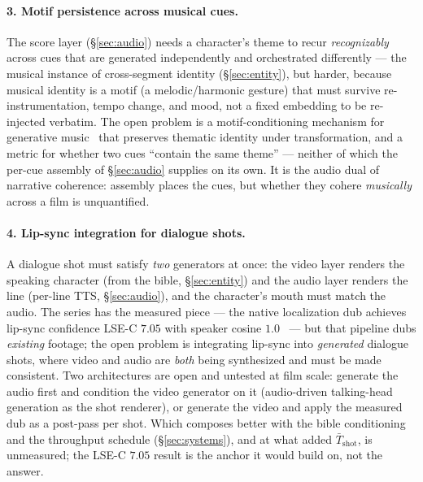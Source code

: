 \documentclass[11pt]{article}
\newcommand{\Tshot}{\ensuremath{\bar{T}_{\mathrm{shot}}}}
\begin{document}
\paragraph{3. Motif persistence across musical cues.} The score layer (\S\ref{sec:audio}) needs a character's
theme to recur \emph{recognizably} across cues that are generated independently and orchestrated differently ---
the musical instance of cross-segment identity (\S\ref{sec:entity}), but harder, because musical identity is a
motif (a melodic/harmonic gesture) that must survive re-instrumentation, tempo change, and mood, not a fixed
embedding to be re-injected verbatim. The open problem is a motif-conditioning mechanism for generative
music~\cite{acestep} that preserves thematic identity under transformation, and a metric for whether two cues
``contain the same theme'' --- neither of which the per-cue assembly of \S\ref{sec:audio} supplies on its own.
It is the audio dual of narrative coherence: assembly places the cues, but whether they cohere \emph{musically}
across a film is unquantified.

\paragraph{4. Lip-sync integration for dialogue shots.} A dialogue shot must satisfy \emph{two} generators at
once: the video layer renders the speaking character (from the bible, \S\ref{sec:entity}) and the audio layer
renders the line (per-line TTS, \S\ref{sec:audio}), and the character's mouth must match the audio. The series
has the measured piece --- the native localization dub achieves lip-sync confidence LSE-C $7.05$ with speaker
cosine $1.0$~\cite{games} --- but that pipeline dubs \emph{existing} footage; the open problem is integrating
lip-sync into \emph{generated} dialogue shots, where video and audio are \emph{both} being synthesized and must
be made consistent. Two architectures are open and untested at film scale: generate the audio first and condition
the video generator on it (audio-driven talking-head generation as the shot renderer), or generate the video and
apply the measured dub as a post-pass per shot. Which composes better with the bible conditioning and the
throughput schedule (\S\ref{sec:systems}), and at what added $\Tshot$, is unmeasured; the LSE-C $7.05$ result is
the anchor it would build on, not the answer.
\end{document}
